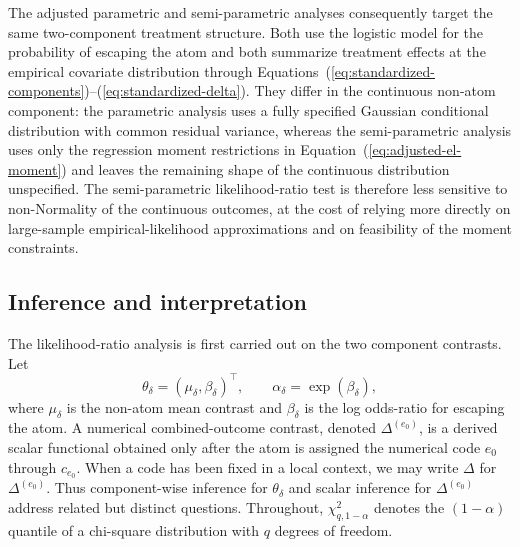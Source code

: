 \documentclass[11pt]{article}
\begin{document}
The adjusted parametric and semi-parametric analyses consequently target the same two-component treatment structure. Both use the logistic model for the probability of escaping the atom and both summarize treatment effects at the empirical covariate distribution through Equations~(\ref{eq:standardized-components})--(\ref{eq:standardized-delta}). They differ in the continuous non-atom component: the parametric analysis uses a fully specified Gaussian conditional distribution with common residual variance, whereas the semi-parametric analysis uses only the regression moment restrictions in Equation~(\ref{eq:adjusted-el-moment}) and leaves the remaining shape of the continuous distribution unspecified. The semi-parametric likelihood-ratio test is therefore less sensitive to non-Normality of the continuous outcomes, at the cost of relying more directly on large-sample empirical-likelihood approximations and on feasibility of the moment constraints.

\subsection{Inference and interpretation}

The likelihood-ratio analysis is first carried out on the two component contrasts. Let
\[
  \theta_\delta=(\mu_\delta,\beta_\delta)^\top,
  \qquad
  \alpha_\delta=\exp(\beta_\delta),
\]
where $\mu_\delta$ is the non-atom mean contrast and $\beta_\delta$ is the log odds-ratio for escaping the atom. A numerical combined-outcome contrast, denoted $\Delta^{(e_0)}$, is a derived scalar functional obtained only after the atom is assigned the numerical code $e_0$ through $c_{e_0}$. When a code has been fixed in a local context, we may write $\Delta$ for $\Delta^{(e_0)}$. Thus component-wise inference for $\theta_\delta$ and scalar inference for $\Delta^{(e_0)}$ address related but distinct questions. Throughout, $\chi^2_{q,1-\alpha}$ denotes the $(1-\alpha)$ quantile of a chi-square distribution with $q$ degrees of freedom.
\end{document}
